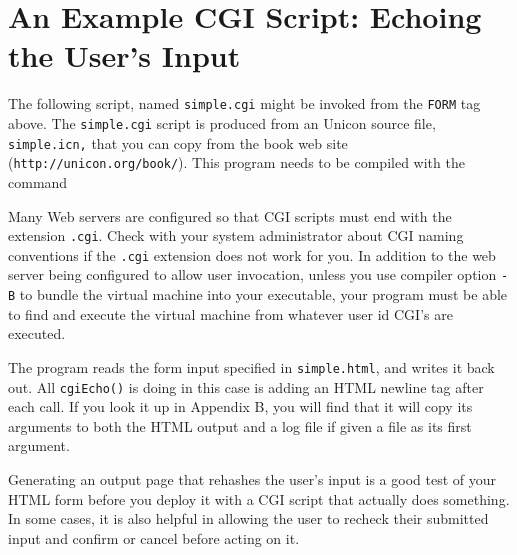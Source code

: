 \section{An Example CGI Script: Echoing the User's Input}

The following script, named \texttt{simple.cgi} might be invoked from
the \texttt{FORM} tag above. The \texttt{simple.cgi} script is produced
from an Unicon source file, \texttt{simple.icn}\texttt{,} that you can
copy from the book web site
(\texttt{http://unicon.org/book/}). This program needs to
be compiled with the command


Many Web servers are configured so that CGI scripts must end with the
extension \texttt{.cgi}. Check with your system administrator about CGI
naming conventions if the \texttt{.cgi} extension does not work for
you. In addition to the web server being configured to allow user
invocation, unless you use compiler option \texttt{{}-B} to bundle the
virtual machine into your executable, your program must be able to find
and execute the virtual machine from whatever user id
CGI's are executed.

The program reads the form input specified in \texttt{simple.html}, and
writes it back out. All \texttt{cgiEcho()} is doing in this case is
adding an HTML newline tag after each call. If you look it up in
Appendix B, you will find that it will copy its arguments to both the
HTML output and a log file if given a file as its first argument.


Generating an output page that rehashes the user's
input is a good test of your HTML form before you deploy it with a CGI
script that actually does something. In some cases, it is also helpful
in allowing the user to recheck their submitted input and confirm or
cancel before acting on it.

